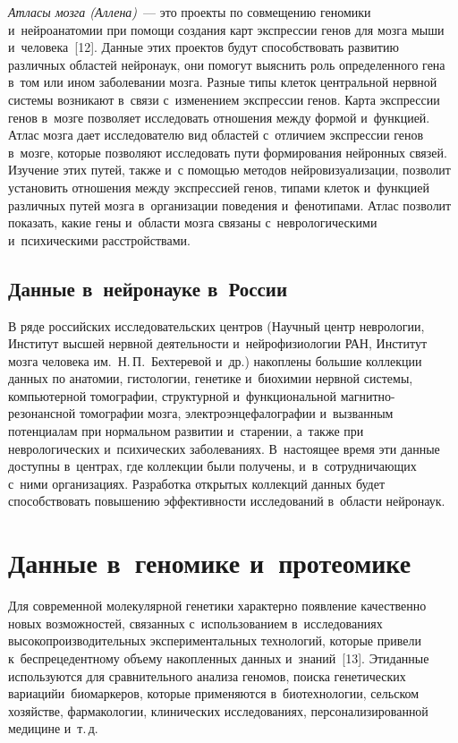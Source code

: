 \begin{multicols}{2}
  \textit{Атласы мозга (Аллена)}~--- это проекты по совмещению геномики и~нейроанатомии 
при помощи создания карт экспрессии генов для мозга мыши и~человека~[12]. Данные 
этих проектов будут способствовать развитию различных областей нейронаук, они 
помогут выяснить роль определенного гена в~том или ином заболевании мозга. Разные 
типы клеток центральной нервной системы возникают в~связи с~изменением экспрессии 
генов. Карта экспрессии генов в~мозге позволяет исследовать отношения между формой 
и~функцией. Атлас мозга дает исследователю вид областей с~отличием экспрессии генов 
в~мозге, которые позволяют исследовать пути формирования нейронных связей. Изучение 
этих путей, также и~с помощью методов нейровизуализации, позволит установить 
отношения между экспрессией генов, типами клеток и~функцией различных путей мозга 
в~организации поведения и~фенотипами. Атлас позволит показать, какие гены и~области 
мозга связаны с~неврологическими и~психическими расстройствами. 

\subsection{Данные в~нейронауке в~России}

В ряде российских исследовательских центров (Научный центр неврологии, Институт 
высшей нервной деятельности и~нейрофизиологии РАН, Институт мозга человека им.\ 
Н.\,П.~Бехтеревой и~др.) накоплены большие коллекции данных по анатомии, гистологии, 
генетике и~биохимии нервной системы, компьютерной томографии, структурной 
и~функциональной магнитно-резонансной томографии мозга, электроэнцефалографии 
и~вызванным потенциалам при нормальном развитии и~старении, а~так\-же при 
неврологических и~психических заболеваниях. В~настоящее время эти данные доступны 
в~центрах, где коллекции были получены, и~в~сотрудничающих с~ними организациях. 
Разработка открытых коллекций данных будет способствовать повышению эффективности 
исследований в~области нейронаук.

\section{Данные в~геномике и~протеомике}

  Для современной молекулярной генетики ха\-рак\-терно появление качественно новых 
возможно\-стей, связанных с~использованием в~исследованиях высокопроизводительных 
экспериментальных технологий, которые привели к~беспрецедентному объему 
накопленных данных и~знаний~[13]. Эти\linebreak данные используются для сравнительного 
ана\-лиза геномов, поиска генетических вариаций\linebreak и~биомаркеров, которые применяются 
в~биотехнологии, сельском хозяйстве, фармакологии, клинических исследованиях, 
персонализированной медицине и~т.\,д.
  

\end{multicols}
